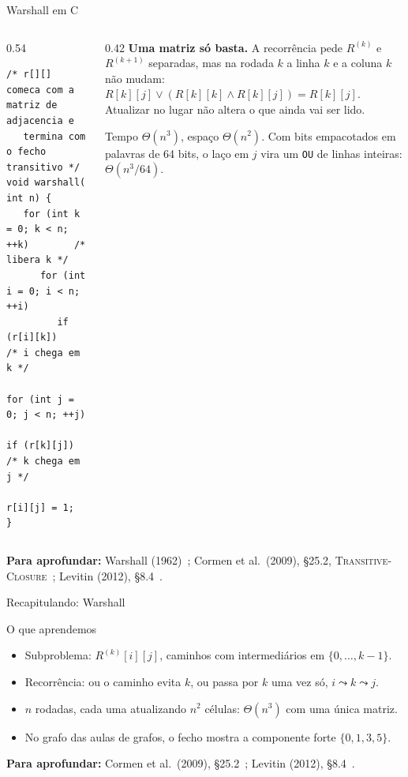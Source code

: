 \documentclass[aspectratio=169,xcolor=table]{beamer}
\newcommand{\fonte}[1]{%
  \vfill
  {\tiny\color{gray!55!black}\textbf{Para aprofundar:} #1\par}%
}
\begin{document}
\begin{frame}[fragile]{Warshall em C}
  \begin{columns}[T]
    \begin{column}{0.54\textwidth}
\begin{lstlisting}[basicstyle=\ttfamily\tiny]
/* r[][] comeca com a matriz de adjacencia e
   termina com o fecho transitivo */
void warshall( int n) {
   for (int k = 0; k < n; ++k)        /* libera k */
      for (int i = 0; i < n; ++i)
         if (r[i][k])                 /* i chega em k */
            for (int j = 0; j < n; ++j)
               if (r[k][j])           /* k chega em j */
                  r[i][j] = 1;
}
\end{lstlisting}
    \end{column}
    \begin{column}{0.42\textwidth}
      \scriptsize\textbf{Uma matriz só basta.} A recorrência pede $R^{(k)}$ e $R^{(k+1)}$
      separadas, mas na rodada $k$ a linha $k$ e a coluna $k$ não mudam:
      $R[k][j] \lor (R[k][k] \land R[k][j]) = R[k][j]$. Atualizar no lugar não altera o que
      ainda vai ser lido.
      \medskip

      Tempo $\Theta(n^3)$, espaço $\Theta(n^2)$. Com bits empacotados em palavras de 64 bits,
      o laço em $j$ vira um \texttt{OU} de linhas inteiras: $\Theta(n^3/64)$.
    \end{column}
  \end{columns}
  \fonte{Warshall (1962)~\cite{warshall1962theorem}; Cormen et al.\ (2009), \S 25.2,
    \textsc{Transitive-Closure}~\cite{cormen2009introduction}; Levitin (2012),
    \S 8.4~\cite{levitin2012introduction}.}
\end{frame}

\begin{frame}{Recapitulando: Warshall}
  \begin{block}{O que aprendemos}
    \begin{itemize}\scriptsize
      \item Subproblema: $R^{(k)}[i][j]$, caminhos com intermediários em $\{0,\dots,k-1\}$.
      \item Recorrência: ou o caminho evita $k$, ou passa por $k$ uma vez só, $i \leadsto k
            \leadsto j$.
      \item $n$ rodadas, cada uma atualizando $n^2$ células: $\Theta(n^3)$ com uma única matriz.
      \item No grafo das aulas de grafos, o fecho mostra a componente forte $\{0,1,3,5\}$.
    \end{itemize}
  \end{block}
  \fonte{Cormen et al.\ (2009), \S 25.2~\cite{cormen2009introduction};
    Levitin (2012), \S 8.4~\cite{levitin2012introduction}.}
\end{frame}
\end{document}
